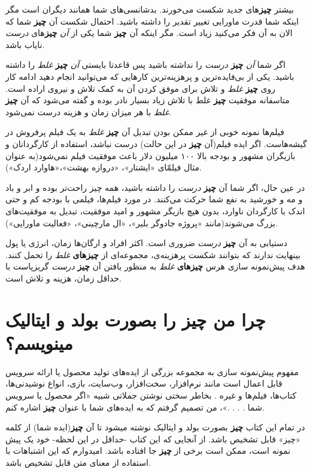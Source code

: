 بیشتر \textbf{چیز}های جدید شکست می‌خورند. بدشانسی‌های شما همانند دیگران
است مگر اینکه شما قدرت ماورایی تغییر تقدیر را داشته باشید. احتمال شکست
آن \textbf{چیز} شما که الان به آن فکر می‌کنید زیاد است. مگر اینکه آن
\textbf{چیز} شما یکی از \emph{آن} \textbf{چیز}های \emph{درست} نایاب
باشد.

اگر شما \emph{آن} \textbf{چیز} \emph{درست} را نداشته باشید پس قاعدتا
بایستی \emph{آن} \textbf{چیز} \emph{غلط} را داشته باشید. یکی از
بی‌فایده‌ترین و پرهزینه‌ترین کارهایی که می‌توانید انجام دهید ادامه کار
روی \textbf{چیز} \emph{غلط} و تلاش برای موفق کردن آن به کمک تلاش و نیروی
اراده است. متاسفانه موفقیت \textbf{چیز} غلط با تلاش زیاد بسیار نادر بوده
و گفته می‌شود که آن \textbf{چیز} \emph{غلط} با هر میزان زمان و هزینه
درست نمی‌شود.

فیلم‌ها نمونه خوبی از غیر ممکن بودن تبدیل آن \textbf{چیز} \emph{غلط} به
یک فیلم پرفروش در گیشه‌هاست. اگر ایده فیلم(آن \textbf{چیز} در این حالت)
درست نباشد، استفاده از کارگردانان و بازیگران مشهور و بودجه بالا ۱۰۰
میلیون دلار باعث موفقیت فیلم نمی‌شود(به عنوان مثال فیلمّای «ایشتار»،
«دروازه بهشت»،«هاوارد اردک»).

در عین حال، اگر شما آن \textbf{چیز} \emph{درست} را داشته باشید، همه چیز
راحت‌تر بوده و ابر و باد و مه و خورشید به نفع شما حرکت می‌کنند. در مورد
فیلم‌ها، فیلمی با بودجه کم و حتی اندک با کارگردان ناوارد، بدون هیچ
بازیگر مشهور و امید موفقیت، تبدیل به موفقیت‌های بزرگ می‌شوند(مانند
«پروژه جادوگر بلیر»، «ال مارچینی»، «فعالیت ماورایی»).

دستیابی به آن \textbf{چیز} \emph{درست} ضروری است. اکثر افراد و ارگان‌ها
زمان، انرژی یا پول بینهایت ندارند که بتوانند شکست پرهزینه‌ی، مجموعه‌ای
از \textbf{چیزهای} \emph{غلط} را تحمل کنند. هدف پیش‌نمونه سازی هرس
\textbf{چیزهای} \emph{غلط} به منظور یافتن آن \textbf{چیز} \emph{درست}
گریزپاست با حداقل زمان، هزینه و تلاش است.

\section{چرا من \textbf{چیز} را بصورت بولد و ایتالیک
مینویسم؟}\label{ux686ux631ux627-ux645ux646-ux686ux6ccux632-ux631ux627-ux628ux635ux648ux631ux62a-ux628ux648ux644ux62f-ux648-ux627ux6ccux62aux627ux644ux6ccux6a9-ux645ux6ccux646ux648ux6ccux633ux645}

مفهوم پیش‌نمونه سازی به مجموعه بزرگی از ایده‌های تولید محصول یا ارائه
سرویس قابل اعمال است مانند نرم‌افزار، سخت‌افزار، وب‌سایت، بازی، انواع
نوشیدنی‌ها، کتاب‌ها، فیلم‌ها و غیره . بخاطر سختی نوشتن جملاتی شبیه «اگر
محصول یا سرویس شما . . . .»، من تصمیم گرفتم که به ایده‌های شما با عنوان
\textbf{چیز} اشاره کنم.

در تمام این کتاب \textbf{چیز} بصورت بولد و ایتالیک نوشته میشود تا آن
\textbf{چیز}(ایده شما) از کلمه «چیز» قابل تشخیص باشد. از آنجایی که این
کتاب -حداقل در این لحظه- خود یک پیش نمونه است، ممکن است برخی از
\textbf{چیز} جا افتاده باشد. امیدوارم که این اشتباهات با استفاده از
معنای متن قابل تشخیص باشد.

